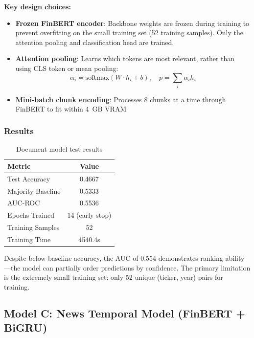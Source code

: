 \documentclass[12pt,a4paper]{article}
\begin{document}
\textbf{Key design choices:}
\begin{itemize}[noitemsep]
    \item \textbf{Frozen FinBERT encoder}: Backbone weights are frozen during training to prevent overfitting on the small training set (52 training samples). Only the attention pooling and classification head are trained.
    \item \textbf{Attention pooling}: Learns which tokens are most relevant, rather than using CLS token or mean pooling:
    \begin{equation}
    \alpha_i = \text{softmax}(W \cdot h_i + b), \quad p = \sum_i \alpha_i h_i
    \end{equation}
    \item \textbf{Mini-batch chunk encoding}: Processes 8 chunks at a time through FinBERT to fit within 4~GB VRAM
\end{itemize}

\subsubsection{Results}

\begin{table}[H]
\centering
\begin{tabular}{lc}
\toprule
\textbf{Metric} & \textbf{Value} \\
\midrule
Test Accuracy & 0.4667 \\
Majority Baseline & 0.5333 \\
AUC-ROC & 0.5536 \\
Epochs Trained & 14 (early stop) \\
Training Samples & 52 \\
Training Time & 4540.4s \\
\bottomrule
\end{tabular}
\caption{Document model test results}
\label{tab:doc_results}
\end{table}

\noindent Despite below-baseline accuracy, the AUC of 0.554 demonstrates ranking ability---the model can partially order predictions by confidence. The primary limitation is the extremely small training set: only 52 unique (ticker, year) pairs for training.

\subsection{Model C: News Temporal Model (FinBERT + BiGRU)}
\end{document}
